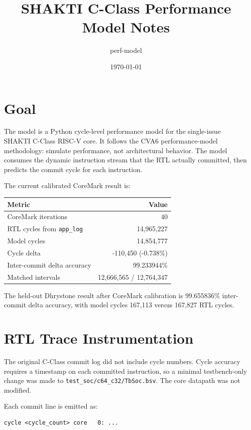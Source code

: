 \documentclass[11pt]{article}
\title{SHAKTI C-Class Performance Model Notes}
\author{perf-model}
\date{\today}
\begin{document}
\maketitle

\section{Goal}

The model is a Python cycle-level performance model for the single-issue SHAKTI
C-Class RISC-V core. It follows the CVA6 performance-model methodology: simulate
performance, not architectural behavior. The model consumes the dynamic
instruction stream that the RTL actually committed, then predicts the commit
cycle for each instruction.

The current calibrated CoreMark result is:

\begin{center}
\begin{tabular}{|l|r|}
\hline
Metric & Value \\
\hline
CoreMark iterations & 40 \\
RTL cycles from \texttt{app\_log} & 14,965,227 \\
Model cycles & 14,854,777 \\
Cycle delta & -110,450 (-0.738\%) \\
Inter-commit delta accuracy & 99.233944\% \\
Matched intervals & 12,666,565 / 12,764,347 \\
\hline
\end{tabular}
\end{center}

The held-out Dhrystone result after CoreMark calibration is 99.655836\%
inter-commit delta accuracy, with model cycles 167,113 versus 167,827 RTL cycles.

\section{RTL Trace Instrumentation}

The original C-Class commit log did not include cycle numbers. Cycle accuracy
requires a timestamp on each committed instruction, so a minimal testbench-only
change was made to \texttt{test\_soc/c64\_c32/TbSoc.bsv}. The core datapath was
not modified.

Each commit line is emitted as:

\begin{verbatim}
cycle <cycle_count> core   0: ...
\end{verbatim}
\end{document}
